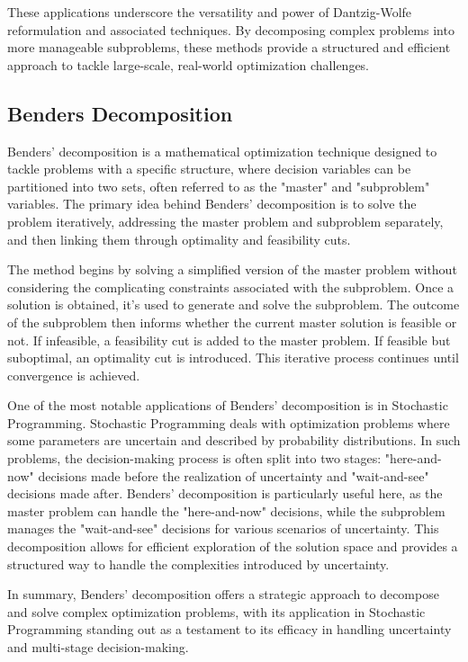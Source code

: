 These applications underscore the versatility and power of Dantzig-Wolfe reformulation and associated techniques. By decomposing complex problems into more manageable subproblems, these methods provide a structured and efficient approach to tackle large-scale, real-world optimization challenges.



\subsection{Benders Decomposition}

Benders' decomposition is a mathematical optimization technique designed to tackle problems with a specific structure, where decision variables can be partitioned into two sets, often referred to as the "master" and "subproblem" variables. The primary idea behind Benders' decomposition is to solve the problem iteratively, addressing the master problem and subproblem separately, and then linking them through optimality and feasibility cuts.

The method begins by solving a simplified version of the master problem without considering the complicating constraints associated with the subproblem. Once a solution is obtained, it's used to generate and solve the subproblem. The outcome of the subproblem then informs whether the current master solution is feasible or not. If infeasible, a feasibility cut is added to the master problem. If feasible but suboptimal, an optimality cut is introduced. This iterative process continues until convergence is achieved.

One of the most notable applications of Benders' decomposition is in Stochastic Programming. Stochastic Programming deals with optimization problems where some parameters are uncertain and described by probability distributions. In such problems, the decision-making process is often split into two stages: "here-and-now" decisions made before the realization of uncertainty and "wait-and-see" decisions made after. Benders' decomposition is particularly useful here, as the master problem can handle the "here-and-now" decisions, while the subproblem manages the "wait-and-see" decisions for various scenarios of uncertainty. This decomposition allows for efficient exploration of the solution space and provides a structured way to handle the complexities introduced by uncertainty.

In summary, Benders' decomposition offers a strategic approach to decompose and solve complex optimization problems, with its application in Stochastic Programming standing out as a testament to its efficacy in handling uncertainty and multi-stage decision-making.



